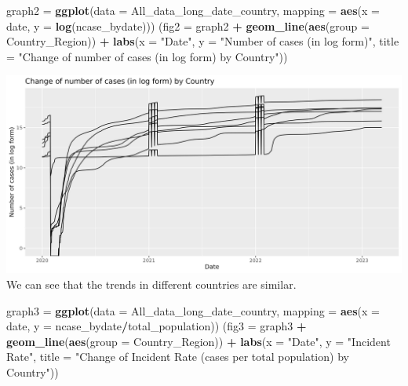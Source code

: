 \documentclass[
]{article}
\newenvironment{Shaded}{\begin{snugshade}}{\end{snugshade}}
\newcommand{\AttributeTok}[1]{\textcolor[rgb]{0.13,0.29,0.53}{#1}}
\newcommand{\FunctionTok}[1]{\textcolor[rgb]{0.13,0.29,0.53}{\textbf{#1}}}
\newcommand{\NormalTok}[1]{#1}
\newcommand{\OtherTok}[1]{\textcolor[rgb]{0.56,0.35,0.01}{#1}}
\newcommand{\SpecialCharTok}[1]{\textcolor[rgb]{0.81,0.36,0.00}{\textbf{#1}}}
\newcommand{\StringTok}[1]{\textcolor[rgb]{0.31,0.60,0.02}{#1}}
\begin{document}
\begin{Shaded}
\begin{Highlighting}[]
\NormalTok{graph2 }\OtherTok{=} \FunctionTok{ggplot}\NormalTok{(}\AttributeTok{data =}\NormalTok{ All\_data\_long\_date\_country, }\AttributeTok{mapping =} \FunctionTok{aes}\NormalTok{(}\AttributeTok{x =}\NormalTok{ date, }\AttributeTok{y =} \FunctionTok{log}\NormalTok{(ncase\_bydate)))}
\NormalTok{(}\AttributeTok{fig2 =}\NormalTok{ graph2 }\SpecialCharTok{+} \FunctionTok{geom\_line}\NormalTok{(}\FunctionTok{aes}\NormalTok{(}\AttributeTok{group =}\NormalTok{ Country\_Region)) }\SpecialCharTok{+} 
    \FunctionTok{labs}\NormalTok{(}\AttributeTok{x =} \StringTok{"Date"}\NormalTok{, }\AttributeTok{y =} \StringTok{"Number of cases (in log form)"}\NormalTok{, }
         \AttributeTok{title =} \StringTok{"Change of number of cases (in log form) by Country"}\NormalTok{))}
\end{Highlighting}
\end{Shaded}

\includegraphics{../figures/fig2.jpeg} We can see that the trends in
different countries are similar.\\

\begin{Shaded}
\begin{Highlighting}[]
\NormalTok{graph3 }\OtherTok{=} \FunctionTok{ggplot}\NormalTok{(}\AttributeTok{data =}\NormalTok{ All\_data\_long\_date\_country, }\AttributeTok{mapping =} \FunctionTok{aes}\NormalTok{(}\AttributeTok{x =}\NormalTok{ date, }\AttributeTok{y =}\NormalTok{ ncase\_bydate}\SpecialCharTok{/}\NormalTok{total\_population))}
\NormalTok{(}\AttributeTok{fig3 =}\NormalTok{ graph3 }\SpecialCharTok{+} \FunctionTok{geom\_line}\NormalTok{(}\FunctionTok{aes}\NormalTok{(}\AttributeTok{group =}\NormalTok{ Country\_Region)) }\SpecialCharTok{+} 
    \FunctionTok{labs}\NormalTok{(}\AttributeTok{x =} \StringTok{"Date"}\NormalTok{, }\AttributeTok{y =} \StringTok{"Incident Rate"}\NormalTok{, }
         \AttributeTok{title =} \StringTok{"Change of Incident Rate (cases per total population) by Country"}\NormalTok{))}
\end{Highlighting}
\end{Shaded}
\end{document}
